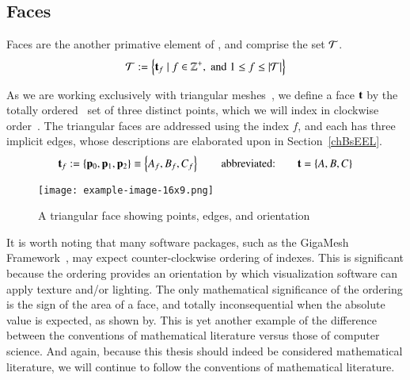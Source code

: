 %
\subsection{Faces}
\label{chBsF}
Faces are the another primative element of \tdd{}, and comprise the set $\mathcal{T}$.
\begin{equation}
	\mathcal{T} := \left \{\mathbf{t}_f \mid f \in \mathbb{Z}^+, \;\text{and}\; 1\leq f \leq|\mathcal{T}| \right \}
	\label{eq:defineSetOfFaces}
\end{equation}%
%
%
%

As we are working exclusively with triangular meshes~\cite[p.~26]{Mara12}, we define a face $\mathbf{t}$ by the totally ordered~\cite{Weisstein19a} set of three distinct points, which we will index in clockwise order~\cite[p.~4]{Mara17}. The triangular faces are addressed using the index $f$, and each has three implicit edges, whose descriptions are elaborated upon in Section~\ref{chBsEEL}.
\begin{equation}
	\mathbf{t}_f := \left \{\mathbf{p}_0, \mathbf{p}_1, \mathbf{p}_2\right \} \equiv \left \{A_f, B_f, C_f\right \} \hspace{20pt}\text{abbreviated:}\hspace{20pt} \mathbf{t} = \left \{A, B, C\right \}
	\label{eq:defineSetOfFaces}
\end{equation}%
%
%

\begin{figure}[ht]
\ffigbox
	{\texttt{[image: example-image-16x9.png]}}
	{\caption[A Triangular Face]{A triangular face showing points, edges, and orientation}\label{fig:facesOfAMesh}}
\end{figure}%

It is worth noting that many software packages, such as the GigaMesh Framework~\cite[p.~89]{Mara12}, may expect counter-clockwise ordering of indexes.  This is significant because the ordering provides an orientation by which visualization software can apply texture and/or lighting. The only mathematical significance of the ordering is the sign of the area of a face, and totally inconsequential when the absolute value is expected, as shown by\cite[p.~2]{Braden86}. This is yet another example of the difference between the conventions of mathematical literature versus those of computer science. And again, because this thesis should indeed be considered mathematical literature, we will continue to follow the conventions of mathematical literature.
%
